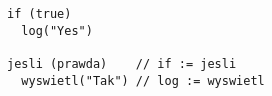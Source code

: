 \vspace{-2.25em}
\begin{center}
\begin{minipage}[t]{1\textwidth}
\begin{listing}[H]
\begin{spacing}{0.6}
\begin{verbatim}
if (true)
  log("Yes")

jesli (prawda)    // if := jesli
  wyswietl("Tak") // log := wyswietl
\end{verbatim}
\end{spacing}
\end{listing}
\end{minipage}
\end{center}
